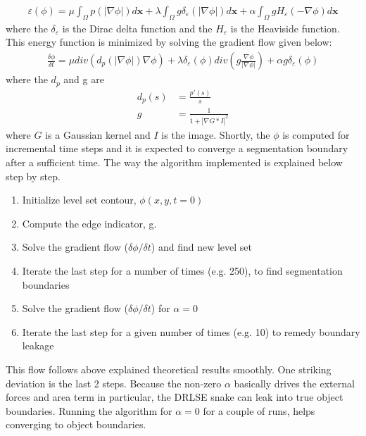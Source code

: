 \documentclass{article}
\begin{document}
\begin{align*}
\varepsilon(\phi) = \mu\int_\Omega p(|\nabla \phi | ) d \mathbf{x} +  \lambda\int_\Omega g\delta_{\varepsilon}(|\nabla \phi | ) d \mathbf{x} +  \alpha \int_\Omega g H_{\varepsilon}(- \nabla \phi  ) d \mathbf{x} 
\end{align*}
where the $\delta_{\varepsilon}$ is the Dirac delta function and the $H_{\varepsilon}$ is the Heaviside function. This energy function is minimized by solving the gradient flow given below:
\begin{align*}
\frac{\delta \phi}{\delta t} = \mu div(d_p( |\nabla \phi | ) \nabla \phi ) + \lambda \delta_{\varepsilon}(\phi)div \left( g \frac{\nabla \phi}{|\nabla \phi|} \right) + \alpha g \delta_{\varepsilon}(\phi)
\end{align*}
where the $d_p$ and g are 
\begin{align*}
d_p(s)&=\frac{p'(s)}{s}\\
g &= \frac{1}{1+|\nabla G * I|^2}
\end{align*}
where $G$ is a Gaussian kernel and $I$ is the image. Shortly, the $\phi$ is computed for incremental time steps and it is expected to converge a segmentation boundary after a sufficient time. The way the algorithm implemented is explained below step by step.
\begin{enumerate}
\item Initialize level set contour, $\phi (x,y, t=0)$
\item Compute the edge indicator, g.
\item Solve the gradient flow ($\delta \phi / \delta t$) and find new level set
\item Iterate the last step for a number of times (e.g. 250), to find segmentation boundaries
\item Solve the gradient flow ($\delta \phi / \delta t$)  for $\alpha=0$
\item Iterate the last step for a given number of times (e.g. 10) to remedy boundary leakage
\end{enumerate}
This flow follows above explained theoretical results smoothly. One striking deviation is the last 2 steps. Because the non-zero $\alpha$ basically drives the external forces and area term in particular, the DRLSE snake can leak into true object boundaries. Running the algorithm for $\alpha=0$ for a couple of runs, helps converging to object boundaries. 
\end{document}
